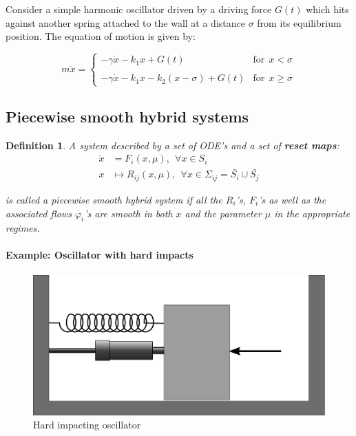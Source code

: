 \documentclass{book}
\renewcommand{\(}{\begin{columns}}
\renewcommand{\)}{\end{columns}}
\newcommand{\<}[1]{\begin{column}{#1}}
\renewcommand{\>}{\end{column}}
\newcommand{\bb}[1]{\textbf{#1}}
\newcommand{\para}{\paragraph}
\newtheorem{definition}{Definition}[section]
\begin{document}
Consider a simple harmonic oscillator driven by a driving force $G(t)$ which 
hits against another spring attached to the wall at a distance $\sigma$ from 
its equilibrium position. The equation of motion is given by:

\begin{equation}
\label{eq-soft_impact}
m\ddot{x}=
\begin{cases} 
-\gamma \dot{x}-k_1x+G(t)&\mathrm{for}~~x<\sigma
\\ \\ 
-\gamma \dot{x}-k_1x-k_2(x-\sigma)+G(t)&\mathrm{for}~~x\geq\sigma 
\end{cases}
\end{equation}

%

\subsection{Piecewise smooth hybrid systems}
\begin{definition}
A system described by a set of ODE's and a set of \bb{reset maps}:
\begin{align}
\label{def-hybrid}
\dot{x}&=F_i(x,\mu),~~\forall x\in S_i\\
x&\mapsto R_{ij}(x,\mu),~~\forall x\in\Sigma_{ij}=\bar{S_i}\cup\bar{S_j}
\end{align}

is called a piecewise smooth hybrid system if all the $R_i$'s, $F_i$'s as well 
as the associated flows $\varphi_i$'s are smooth in both $x$ and the parameter 
$\mu$ in the appropriate regimes.  
\end{definition}

\para{Example: Oscillator with hard impacts\\}
\begin{figure}[!hbp]
\caption{Hard impacting oscillator}
\begin{center}
\includegraphics[width=0.5\columnwidth]{hardcol}
\end{center}
\end{figure}
\end{document}
